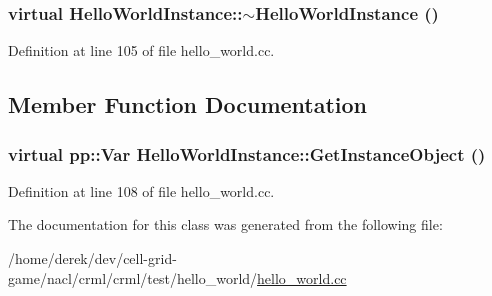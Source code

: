 \hypertarget{class_hello_world_instance_ab82a0f1aa35b3f8fbc2e107af026bfc5}{
\subsubsection[{$\sim$HelloWorldInstance}]{\setlength{\rightskip}{0pt plus 5cm}virtual HelloWorldInstance::$\sim$HelloWorldInstance ()}}
\label{class_hello_world_instance_ab82a0f1aa35b3f8fbc2e107af026bfc5}


Definition at line 105 of file hello\_\-world.cc.



\subsection{Member Function Documentation}
\hypertarget{class_hello_world_instance_ac489a6775aead72dc1b17d22d1eb6688}{
\subsubsection[{GetInstanceObject}]{\setlength{\rightskip}{0pt plus 5cm}virtual pp::Var HelloWorldInstance::GetInstanceObject ()}}
\label{class_hello_world_instance_ac489a6775aead72dc1b17d22d1eb6688}


Definition at line 108 of file hello\_\-world.cc.



The documentation for this class was generated from the following file:\begin{DoxyCompactItemize}
\item 
/home/derek/dev/cell-\/grid-\/game/nacl/crml/crml/test/hello\_\-world/\hyperlink{hello__world_8cc}{hello\_\-world.cc}\end{DoxyCompactItemize}
